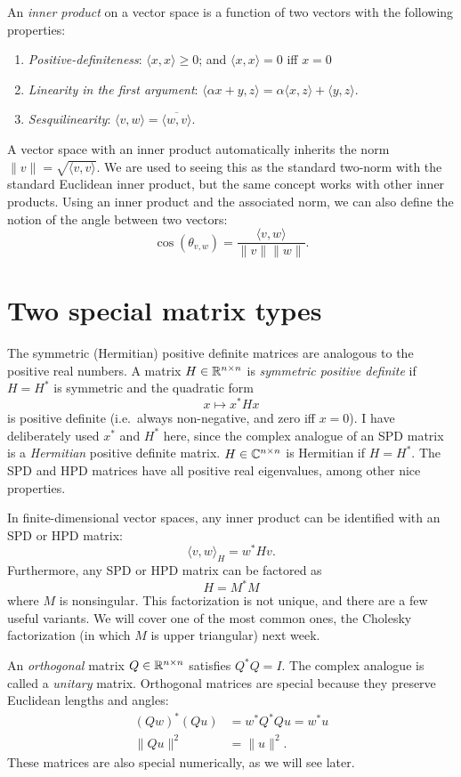 \documentclass[12pt, leqno]{article}
\begin{document}
An {\em inner product} on a vector space is a function of
two vectors with the following properties:
\begin{enumerate}
\item {\em Positive-definiteness}: $\langle x, x
  \rangle \geq 0$; and $\langle x, x \rangle = 0$ iff $x = 0$
\item {\em Linearity in the first argument}: $\langle \alpha x + y, z
  \rangle = \alpha \langle x, z \rangle + \langle y, z \rangle$.
\item {\em Sesquilinearity}: 
  $\langle v, w \rangle = \overline{\langle w, v \rangle}$.
\end{enumerate}
A vector space with an inner product automatically inherits the norm 
$\|v\| = \sqrt{\langle v, v \rangle}$.  We are used to seeing this as
the standard two-norm with the standard Euclidean inner product, but
the same concept works with other inner products.  Using an inner
product and the associated norm, we can also define the notion of the
angle between two vectors:
\[
  \cos(\theta_{v,w}) = \frac{\langle v,w \rangle}{\|v\| \|w\|}.
\]

\section*{Two special matrix types}

The symmetric (Hermitian) positive definite matrices are analogous to
the positive real numbers.  A matrix $H \in \mathbb{R}^{n \times n}$ is
{\em symmetric positive definite} if $H = H^*$ is symmetric and the
quadratic form
\[
  x \mapsto x^* H x
\]
is positive definite (i.e.~always non-negative, and zero iff $x = 0$).
I have deliberately used $x^*$ and $H^*$ here, since the complex
analogue of an SPD matrix is a {\em Hermitian} positive definite matrix.
$H \in \mathbb{C}^{n \times n}$ is Hermitian if $H = H^*$.  The SPD and HPD
matrices have all positive real eigenvalues, among other nice properties.

In finite-dimensional vector spaces, any inner product can be
identified with an SPD or HPD matrix:
\[
  \langle v, w \rangle_H = w^* H v.
\]
Furthermore, any SPD or HPD matrix can be factored as
\[
  H = M^* M
\]
where $M$ is nonsingular.  This factorization is not unique, and there
are a few useful variants.  We will cover one of the most common ones,
the Cholesky factorization (in which $M$ is upper triangular) next
week.

An {\em orthogonal} matrix $Q \in \mathbb{R}^{n \times n}$ satisfies $Q^* Q= I$.
The complex analogue is called a {\em unitary} matrix.  Orthogonal
matrices are special because they preserve Euclidean lengths and angles:
\begin{align*}
  (Q w)^* (Q u) &= w^* Q^* Q u = w^* u \\
  \|Qu\|^2 &= \|u\|^2.
\end{align*}
These matrices are also special numerically, as we will see later.
\end{document}
